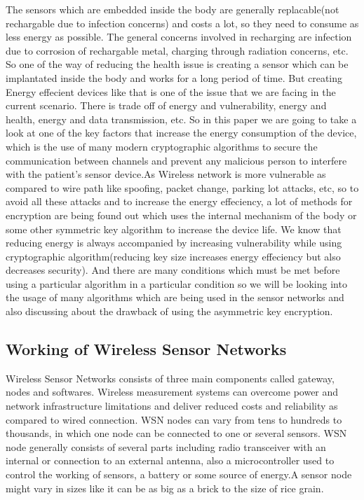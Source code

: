 \documentclass[conference]{IEEEtran}
\begin{document}
\begin{flushleft}
The sensors which are embedded inside the body are generally replacable(not rechargable due to infection concerns) and costs a lot, so they need to consume as less energy as possible. The general concerns involved in recharging are infection due to corrosion of rechargable metal, charging through radiation concerns, etc. So one of the way of reducing the health issue is creating a sensor which can be implantated inside the body and works for a long period of time. But creating Energy effecient devices like that is one of the issue that we are facing in the current scenario. There is trade off of energy and vulnerability, energy and health, energy and data transmission, etc. So in this paper we are going to take a look at one of the key factors that increase the energy consumption of the device, which is the use of many modern cryptographic algorithms to secure the communication between channels and prevent any malicious person to interfere with the patient's sensor device.As Wireless network is more vulnerable as compared to wire path like spoofing, packet change, parking lot attacks, etc, so to avoid all these attacks and to increase the energy effeciency, a lot of methods for encryption are being found out which uses the internal mechanism of the body or some other symmetric key algorithm to increase the device life. We know that reducing energy is always accompanied by increasing vulnerability while using cryptographic algorithm(reducing key size increases energy effeciency but also decreases security). And there are many conditions which must be met before using a particular algorithm in a particular condition so we will be looking into the usage of many algorithms which are being used in the sensor networks and also discussing about the drawback of using the asymmetric key encryption.
\end{flushleft}

\subsection{Working of Wireless Sensor Networks}
\begin{flushleft}
Wireless Sensor Networks consists of three main components called gateway, nodes and softwares. Wireless measurement systems can overcome power and network infrastructure limitations and deliver reduced costs and reliability as compared to wired connection. WSN nodes can vary from tens to hundreds to thousands, in which one node can be connected to one or several sensors. WSN node generally consists of several parts including radio transceiver with an internal or connection to an external antenna, also a microcontroller used to control the working of sensors, a battery or some source of energy.A sensor node might vary in sizes like it can be as big as a brick to the size of rice grain.
\end{flushleft}
\end{document}
